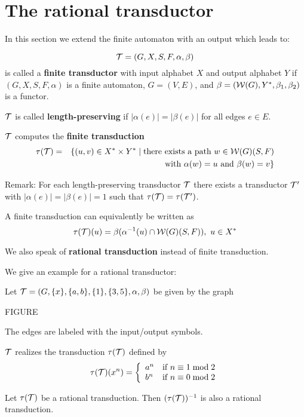 \section{The rational transductor}

In this section we extend the finite automaton with an output which leads to:

\begin{definition}
\[ \mbox{$\mathcal{T}$} = (G, X, S, F, \alpha, \beta) \] is called a {\bf finite transductor}
with input alphabet $X$ and output alphabet $Y$ if $(G, X, S, F, \alpha)$ is a
finite automaton, $G = (V, E)$, and $\beta = (\mbox{$\mathcal{W}(G)$}, Y^*, \beta_1,
\beta_2)$ is a functor.
\end{definition}

$\mbox{$\mathcal{T}$}$ is called {\bf length-preserving} if $|\alpha(e)| = |\beta(e)|$ for all
edges $e \in E$.

$\mbox{$\mathcal{T}$}$ computes the {\bf finite transduction}
\begin{eqnarray*}
\tau(\mbox{$\mathcal{T}$}) & = & \{ (u, v) \in X^* \times Y^* \mid \mbox{there
exists a path } w \in \mbox{$\mathcal{W}(G)$}(S, F) \\
& &  \mbox{ with } \alpha(w) = u \mbox{ and } \beta(w) = v \}
\end{eqnarray*}

Remark: For each length-preserving transductor $\mbox{$\mathcal{T}$}$ there exists a
transductor $\mbox{$\mathcal{T'}$}$ with $|\alpha(e)| = |\beta(e)| = 1$ such that
$\tau(\mbox{$\mathcal{T}$}) = \tau(\mbox{$\mathcal{T'}$})$.

A finite transduction can equivalently be written as 
\[ \tau(\mbox{$\mathcal{T}$})(u) = \beta(\alpha^{-1}(u) \cap \mbox{$\mathcal{W}(G)$}(S, F)),\ u \in X^* \]

We also speak of {\bf rational transduction} instead of finite transduction.

We give an example for a rational transductor:

Let $\mbox{$\mathcal{T}$} = (G, \{x\}, \{a, b\}, \{1\}, \{3, 5\}, \alpha, \beta)$ be given by
the graph

FIGURE

The edges are labeled with the input/output symbols.

$\mbox{$\mathcal{T}$}$ realizes the transduction $\tau(\mbox{$\mathcal{T}$})$ defined by
\[ \tau(\fa{T})(x^n) = \left\{ 
\begin{array}{l@{\quad}l}
a^n & \mbox{if } n \equiv 1 \bmod 2 \\
b^n & \mbox{if } n \equiv 0 \bmod 2
\end{array}
\right. \]

\begin{lemma}
Let $\tau(\mbox{$\mathcal{T}$})$ be a rational transduction. Then $(\tau(\mbox{$\mathcal{T}$}))^{-1}$ is
also a rational transduction.
\end{lemma}

